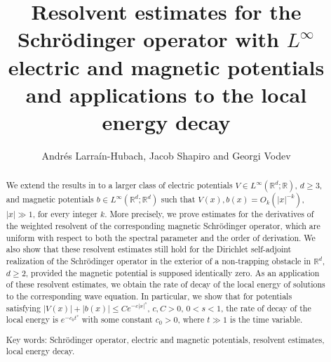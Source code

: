 \documentclass[11pt]{amsart}
\numberwithin{equation}{section}
\def\R{{\mathbb R}}
\begin{document}
\title[Resolvent estimates]{Resolvent estimates for the Schr\"odinger operator 
with $L^\infty$ electric and magnetic potentials and applications to the local energy decay}

\author[A. Larra\'in-Hubach, J. Shapiro, G. Vodev]{Andr\'es Larra\'in-Hubach, Jacob Shapiro and Georgi Vodev}

\address {Department of Mathematics, University of Dayton, Dayton, OH 45469-2316, USA}

\address {Department of Mathematics, University of Dayton, Dayton, OH 45469-2316, USA}

\address {Universit\'e de Nantes, Laboratoire de Math\'ematiques Jean Leray, 2 rue de la Houssini\`ere, BP 92208, 44322 Nantes Cedex 03, France}



\date{}
\begin{abstract} We extend the results in \cite{kn:LSV} to a larger class of electric potentials
$V\in L^\infty(\R^d;\R)$, $d\ge 3$, and magnetic potentials $b\in L^\infty(\R^d;\R^d)$ such that 
$V(x), b(x)=O_k\left(|x|^{-k}\right)$, $|x|\gg 1$, for every integer $k$. More precisely, we prove estimates for the derivatives of the 
weighted resolvent of the 
corresponding magnetic Schr\"odinger operator, which are uniform with respect to both the spectral parameter and
the order of derivation. We also show that these resolvent estimates still hold for the
Dirichlet self-adjoint realization of the Schr\"odinger operator in the exterior of a non-trapping obstacle in $\R^d$, $d\ge 2$,
provided the magnetic potential is supposed identically zero. As an application of these resolvent estimates, 
we obtain the rate of decay of the local energy of solutions to the corresponding wave equation.
In particular, we show that for potentials satisfying $|V(x)|+|b(x)|\le Ce^{-c|x|^s}$, $c,C>0$, $0<s<1$,
the rate of decay of the local energy is $e^{-c_0t^s}$ with some constant $c_0>0$, where $t\gg 1$ is the time variable.

Key words: Schr\"odinger operator, electric and magnetic potentials, resolvent estimates, local energy decay.

\end{abstract} 


\maketitle
\end{document}
